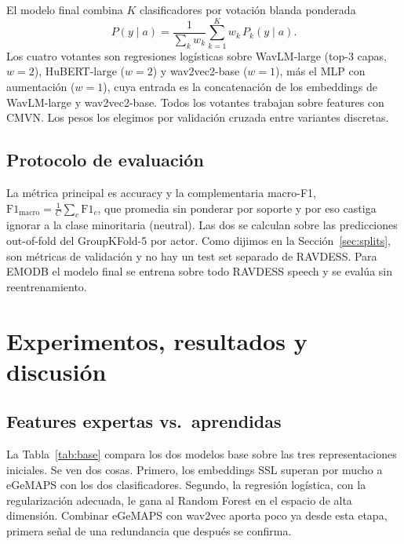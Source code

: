 \documentclass[conference]{IEEEtran}
\begin{document}
El modelo final combina $K$ clasificadores por votación blanda ponderada
\begin{equation}
P(y \mid a) = \frac{1}{\sum_k w_k} \sum_{k=1}^{K} w_k \, P_k(y \mid a).
\end{equation}
Los cuatro votantes son regresiones logísticas sobre WavLM-large (top-3
capas, $w{=}2$), HuBERT-large ($w{=}2$) y wav2vec2-base ($w{=}1$), más el
MLP con aumentación ($w{=}1$), cuya entrada es la concatenación de los
embeddings de WavLM-large y wav2vec2-base. Todos los
votantes trabajan sobre features con CMVN. Los pesos los elegimos por
validación cruzada entre variantes discretas.

\subsection{Protocolo de evaluación}

La métrica principal es accuracy y la complementaria macro-F1,
$\mathrm{F1}_{\text{macro}} = \frac{1}{C}\sum_{c} \mathrm{F1}_c$, que
promedia sin ponderar por soporte y por eso castiga ignorar a la clase
minoritaria (neutral). Las dos se calculan sobre las predicciones
out-of-fold del GroupKFold-5 por actor. Como dijimos en la
Sección~\ref{sec:splits}, son métricas de validación y no hay un test set
separado de RAVDESS. Para EMODB el modelo final se entrena sobre todo
RAVDESS speech y se evalúa sin reentrenamiento.

\section{Experimentos, resultados y discusión}

\subsection{Features expertas vs.\ aprendidas}

La Tabla~\ref{tab:base} compara los dos modelos base sobre las tres
representaciones iniciales. Se ven dos cosas. Primero, los embeddings SSL
superan por mucho a eGeMAPS con los dos clasificadores. Segundo, la
regresión logística, con la regularización adecuada, le gana al Random
Forest en el espacio de alta dimensión. Combinar eGeMAPS con wav2vec aporta
poco ya desde esta etapa, primera señal de una redundancia que después se
confirma.
\end{document}
